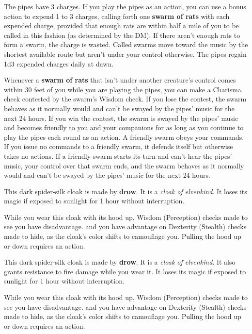 \documentclass[10pt,a4paper,twoside,bg=print,twocolumn,openany,nodeprecatedcode]{dndbook}
\begin{document}
The pipes have 3 charges. If you play the pipes as an action, you can use a bonus action to expend 1 to 3 charges, calling forth one \textbf{swarm of rats} with each expended charge, provided that enough rats are within half a mile of you to be called in this fashion (as determined by the DM). If there aren't enough rats to form a swarm, the charge is wasted. Called swarms move toward the music by the shortest available route but aren't under your control otherwise. The pipes regain 1d3 expended charges daily at dawn.

Whenever a \textbf{swarm of rats} that isn't under another creature's control comes within 30 feet of you while you are playing the pipes, you can make a Charisma check contested by the swarm's Wisdom check. If you lose the contest, the swarm behaves as it normally would and can't be swayed by the pipes' music for the next 24 hours. If you win the contest, the swarm is swayed by the pipes' music and becomes friendly to you and your companions for as long as you continue to play the pipes each round as an action. A friendly swarm obeys your commands. If you issue no commands to a friendly swarm, it defends itself but otherwise takes no actions. If a friendly swarm starts its turn and can't hear the pipes' music, your control over that swarm ends, and the swarm behaves as it normally would and can't be swayed by the pipes' music for the next 24 hours.

This dark spider-silk cloak is made by \textbf{drow}. It is a \textit{cloak of elvenkind}. It loses its magic if exposed to sunlight for 1 hour without interruption.

While you wear this cloak with its hood up, Wisdom (Perception) checks made to see you have disadvantage. and you have advantage on Dexterity (Stealth) checks made to hide, as the cloak's color shifts to camouflage you. Pulling the hood up or down requires an action.

This dark spider-silk cloak is made by \textbf{drow}. It is a \textit{cloak of elvenkind}. It also grants resistance to fire damage while you wear it. It loses its magic if exposed to sunlight for 1 hour without interruption.

While you wear this cloak with its hood up, Wisdom (Perception) checks made to see you have disadvantage. and you have advantage on Dexterity (Stealth) checks made to hide, as the cloak's color shifts to camouflage you. Pulling the hood up or down requires an action.
\end{document}

